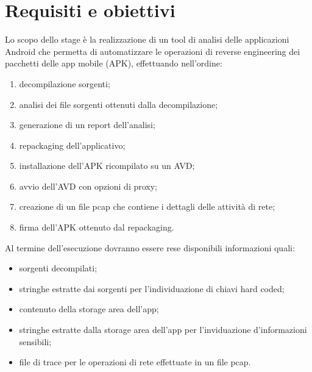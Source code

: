 
\section{Requisiti e obiettivi}\label{sec:requisiti-e-obiettivi}
Lo scopo dello stage è la realizzazione di un tool di analisi delle applicazioni Android che permetta di automatizzare le operazioni di reverse engineering dei pacchetti delle app mobile (APK), effettuando nell'ordine:
\begin{enumerate}
    \setlength\itemsep{0.1em}
    \item decompilazione sorgenti;
    \item analisi dei file sorgenti ottenuti dalla decompilazione;
    \item generazione di un report dell'analisi;
    \item repackaging dell'applicativo;
    \item installazione dell'APK ricompilato su un AVD;
    \item avvio dell'AVD con opzioni di proxy;
    \item creazione di un file \gls{pcap} che contiene i dettagli delle attività di rete;
    \item firma dell'APK ottenuto dal repackaging.
\end{enumerate}
Al termine dell'esecuzione dovranno essere rese disponibili informazioni quali:
\begin{itemize}
    \setlength\itemsep{0.1em}
    \item sorgenti decompilati;
    \item stringhe estratte dai sorgenti per l'individuazione di chiavi hard coded;
    \item contenuto della storage area dell'app;
    \item stringhe estratte dalla storage area dell'app per l'inviduazione d'informazioni sensibili;
    \item file di trace per le operazioni di rete effettuate in un file pcap.
\end{itemize}

